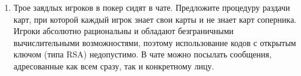 \documentclass[final,pdftex]{../../template/epsilonj}
\begin{document}
\begin{enumerate}
\item Трое заядлых игроков в покер сидят в чате. Предложите процедуру раздачи карт, при которой каждый игрок знает свои карты и не знает карт соперника. Игроки абсолютно рациональны и обладают безграничными вычислительными возможностями, поэтому использование кодов с открытым ключом (типа RSA) недопустимо. В чате можно посылать сообщения, адресованные как всем сразу, так и конкретному лицу.

\end{enumerate}
\end{document}
